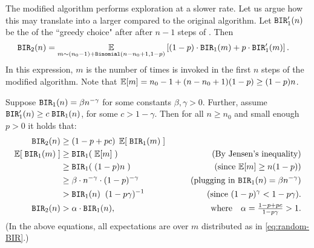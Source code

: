 \begin{remark}
The modified algorithm performs exploration %
at a slower rate. Let us argue how this may translate  into a larger \BIR compared to the original algorithm. Let  $\mathtt{BIR}'_1(n)$ be the \BIR of the ``greedy choice" after after $n-1$ steps of \alg[1]. Then
\begin{align}\label{eq:random-BIR}
\mathtt{BIR}_2(n)
    &= \operatorname*{\mathbb{E}}_{m\sim (n_0-1)+\mathtt{Binomial}(n-n_0+1,1-p)}\left[(1-p) \cdot \mathtt{BIR}_1(m) + p \cdot \mathtt{BIR}'_1(m)\right].
\end{align}
In this expression, $m$ is the number of times \alg[1] is invoked in the first $n$ steps of the modified algorithm. Note that
    $\E[m] = n_0-1 + (n-n_0+1)(1-p) \geq (1-p)n$.

Suppose $\mathtt{BIR}_1(n)= \beta n^{-\gamma}$ for some constants $\beta,\gamma>0$. Further, assume 
    $\mathtt{BIR}'_1(n)\geq  c\; \mathtt{BIR}_1(n)$,
for some $c>1-\gamma$.
Then for all $n\geq n_0$ and small enough $p>0$ it holds that:
\begin{align*}
 \BIR_2(n) 
    &\geq  (1-p+pc)\; \E[\; \BIR_1(m) \;] \\
\E[\; \BIR_1(m) \;]
    &\geq \BIR_1(\; \E[m] \;) &\qquad\text{(By Jensen's inequality)} \\
    &\geq \BIR_1(\; (1-p)n \;) &\qquad\text{(since $\E[m]\geq n(1-p)$)}  \\
    &\geq \beta\cdot n^{-\gamma} \cdot (1-p)^{-\gamma} 
        &\qquad\text{(plugging in $\BIR_1(n)=\beta n^{-\gamma}$)}  \\
    &> \BIR_1(n)\;\; (1-p\gamma)^{-1}
        &\qquad\text{(since $(1-p)^\gamma < 1-p\gamma$)}.\\
\BIR_2(n) 
    &>\alpha\cdot \BIR_1(n),
    &\text{where} \quad 
    \alpha = \tfrac{1-p+pc}{1-p\gamma}>1.
\end{align*}
(In the above equations, all expectations are over $m$ distributed as in \eqref{eq:random-BIR}.)
\end{remark}

